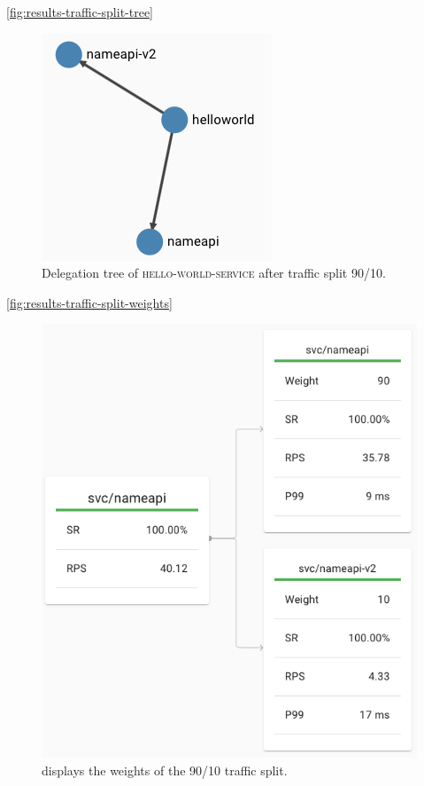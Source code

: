 \autoref{fig:results-traffic-split-tree}

\begin{figure}
	\includegraphics[width=.5\columnwidth]{img/results-traffic-split-tree}
	\centering
	\caption{Delegation tree of \textsc{hello-world-service} after traffic split 90/10.}
	\label{fig:results-traffic-split-tree}
\end{figure}


\autoref{fig:results-traffic-split-weights}

\begin{figure}
	\includegraphics[width=\columnwidth]{img/results-traffic-split-weights}
	\caption{\linkerd{} displays the weights of the 90/10 traffic split.}
	\label{fig:results-traffic-split-weights}
\end{figure}


